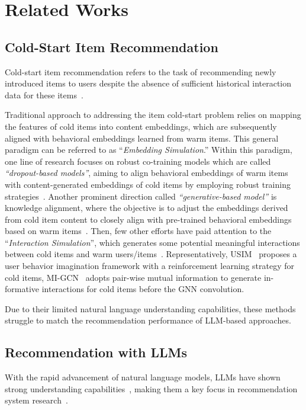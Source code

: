 \section{Related Works}
\subsection{Cold-Start Item Recommendation}
Cold-start item recommendation refers to the task of recommending newly introduced items to users despite the absence of sufficient historical interaction data for these items~\cite {zhang2025cold,liu2024fine,bai2023gorec,zhang2024logical}. 

Traditional approach to addressing the item cold-start problem relies on mapping the features of cold items into content embeddings, which are subsequently aligned with behavioral embeddings learned from warm items. This general paradigm can be referred to as ``\textit{Embedding Simulation}.'' Within this paradigm, one line of research focuses on robust co-training models which are called \textit{``dropout-based models''}, aiming to align behavioral embeddings of warm items with content-generated embeddings of cold items by employing robust training strategies~\cite{volkovs2017dropoutnet,zhu2020heater,wei2021clcrec,shi2019dropoutmethods1,xu2022dropoutmethods2}.
Another prominent direction called \textit{``generative-based model''} is knowledge alignment, where the objective is to adjust the embeddings derived from cold item content to closely align with pre-trained behavioral embeddings based on warm items~\cite{van2013deepmusic,pan2019metaemb,chen2022gar,huang2023aldi}. Then, few other efforts have paid attention to the ``\textit{Interaction Simulation}'', which generates some potential meaningful interactions between cold items and warm users/items~\cite{wang2024mutual,liu2023ucc,liu2024fine}. Representatively, USIM~\cite{liu2024fine} proposes a user behavior imagination framework with a reinforcement learning strategy for cold items,
MI-GCN~\cite{wang2024mutual} adopts pair-wise mutual information to generate in-
formative interactions for cold items before the GNN convolution.

Due to their limited natural language understanding capabilities, these methods struggle to match the recommendation performance of LLM-based approaches.


\subsection{Recommendation with LLMs}
With the rapid advancement of natural language models, LLMs have shown strong understanding capabilities~\cite{wu2024survey,zhang2025survey,hong2024knowledge,hong2024next,chen2024entity}, making them a key focus in recommendation system research~\cite{li2023large,zhao2024recommender,chang2024survey}.


